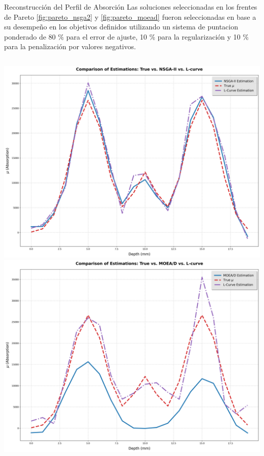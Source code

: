 \documentclass[aspectratio=169,xcolor=dvipsnames]{beamer}
\begin{document}
\begin{frame}{Reconstrucción del Perfil de Absorción}
    Las soluciones seleccionadas en los frentes de Pareto \ref{fig:pareto_nsga2} y \ref{fig:pareto_moead} fueron seleccionadas en base a su desempeño en los objetivos definidos utilizando un sistema de puntacion ponderado de 80 $\%$ para el error de ajuste, 10 $\%$ para la regularización y 10 $\%$ para la penalización por valores negativos.

    \begin{columns}
        \centering
        \includegraphics[width=\textwidth]{img/reconstruction_profiles_nsga2.png} %
        \centering
        \includegraphics[width=\textwidth]{img/reconstruction_profiles_moead.png} %
    \end{columns}
\end{frame}
\end{document}
